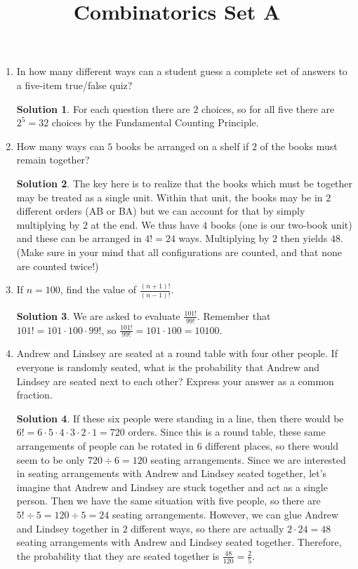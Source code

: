 \documentclass[twocolumn]{article}
\title{Combinatorics Set A}
\author{}
\date{}
\theoremstyle{definition}
\newtheorem*{solution}{Solution}
\begin{document}
\maketitle
\begin{enumerate}
    \item In how many different ways can a student guess a complete set of 
        answers to a five-item true/false quiz?
        \begin{solution}
            For each question there are $2$ choices, so for all five there are 
            $2^5 = 32$ choices by the Fundamental Counting Principle.
        \end{solution}
    \item How many ways can $5$ books be arranged on a shelf if $2$ of the books 
        must remain together?
        \begin{solution}
            The key here is to realize that the books which must be together may 
            be treated as a single unit. Within that unit, the books may be in 
            $2$ different orders (AB or BA) but we can account for that by 
            simply multiplying by $2$ at the end. We thus have $4$ books (one is 
            our two-book unit) and these can be arranged in $4! = 24$ ways.  
            Multiplying by $2$ then yields $48$. (Make sure in your mind that 
            all configurations are counted, and that none are counted twice!)
        \end{solution}
    \item If $n = 100$, find the value of $\frac{(n+1)!}{(n-1)!}$.
        \begin{solution}
            We are asked to evaluate $\frac{101!}{99!}$. Remember that $101! = 
            101 \cdot 100 \cdot 99!$, so $\frac{101!}{99!} = 101 \cdot 100 = 
            10100$.
        \end{solution}
    \item Andrew and Lindsey are seated at a round table with four other people.  
        If everyone is randomly seated, what is the probability that Andrew and 
        Lindsey are seated next to each other? Express your answer as a common 
        fraction.
        \begin{solution}
            If these six people were standing in a line, then there would be $6!  
            = 6 \cdot 5 \cdot 4 \cdot 3 \cdot 2 \cdot 1 = 720$ orders. Since 
            this is a round table, these same arrangements of people can be 
            rotated in $6$ different places, so there would seem to be only $720 
            \div 6 = 120$ seating arrangements. Since we are interested in 
            seating arrangements with Andrew and Lindsey seated together, let's 
            imagine that Andrew and Lindsey are stuck together and act as a 
            single person. Then we have the same situation with five people, so 
            there are $5! \div 5 = 120 \div 5 = 24$ seating arrangements.  
            However, we can glue Andrew and Lindsey together in $2$ different 
            ways, so there are actually $2 \cdot 24 = 48$ seating arrangements 
            with Andrew and Lindsey seated together. Therefore, the probability 
            that they are seated together is $\frac{48}{120} = \frac{2}{5}$.


\end{solution}
\end{enumerate}
\end{document}
